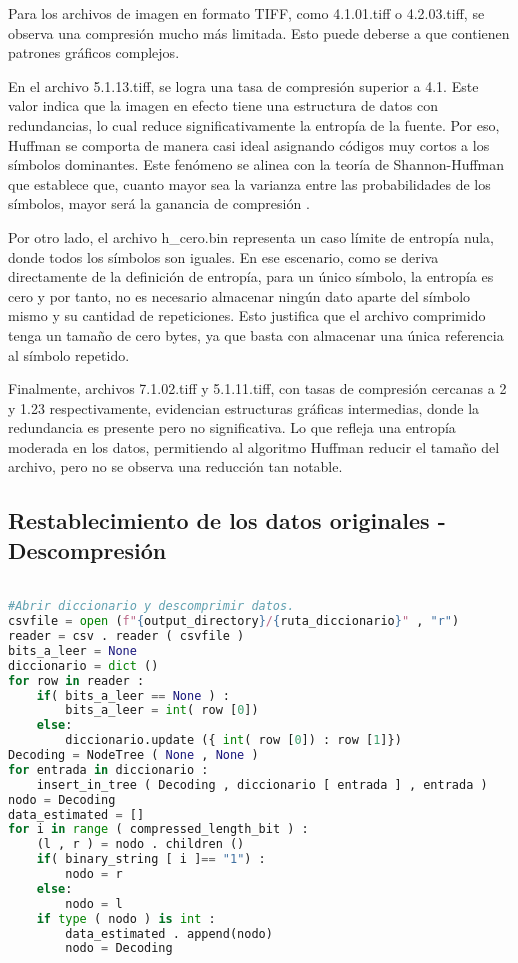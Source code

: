 \documentclass[conference,onecolumn,12pt]{IEEEtran}
\numberwithin{equation}{subsection}
\begin{document}
Para los archivos de imagen en formato TIFF, como 4.1.01.tiff o 4.2.03.tiff, se observa una compresión mucho más limitada. Esto puede deberse a que contienen patrones gráficos complejos.

En el archivo 5.1.13.tiff, se logra una tasa de compresión superior a 4.1. Este valor indica que la imagen en efecto tiene una estructura de datos con redundancias, lo cual reduce significativamente la entropía de la fuente. Por eso, Huffman se comporta de manera casi ideal asignando códigos muy cortos a los símbolos dominantes. Este fenómeno se alinea con la teoría de Shannon-Huffman que establece que, cuanto mayor sea la varianza entre las probabilidades de los símbolos, mayor será la ganancia de compresión \cite{haykin}.

Por otro lado, el archivo h\_cero.bin representa un caso límite de entropía nula, donde todos los símbolos son iguales. En ese escenario, como se deriva directamente de la definición de entropía, para un único símbolo, la entropía es cero y por tanto, no es necesario almacenar ningún dato aparte del símbolo mismo y su cantidad de repeticiones. Esto justifica que el archivo comprimido tenga un tamaño de cero bytes, ya que basta con almacenar una única referencia al símbolo repetido. 

Finalmente, archivos 7.1.02.tiff y 5.1.11.tiff, con tasas de compresión cercanas a 2 y 1.23 respectivamente, evidencian estructuras gráficas intermedias, donde la redundancia es presente pero no significativa. Lo que refleja una entropía moderada en los datos, permitiendo al algoritmo Huffman reducir el tamaño del archivo, pero no se observa una reducción tan notable.









\subsection{Restablecimiento de los datos originales - Descompresión}

\begin{lstlisting}[language=Python, caption={Código modificado para guardar los datos en una carpeta de destino}, label={listing3}]

#Abrir diccionario y descomprimir datos.
csvfile = open (f"{output_directory}/{ruta_diccionario}" , "r")
reader = csv . reader ( csvfile )
bits_a_leer = None 
diccionario = dict () 
for row in reader :
    if( bits_a_leer == None ) :
        bits_a_leer = int( row [0]) 
    else:
        diccionario.update ({ int( row [0]) : row [1]})
Decoding = NodeTree ( None , None ) 
for entrada in diccionario :
    insert_in_tree ( Decoding , diccionario [ entrada ] , entrada )
nodo = Decoding 
data_estimated = []
for i in range ( compressed_length_bit ) :
    (l , r ) = nodo . children () 
    if( binary_string [ i ]== "1") :
        nodo = r
    else:
        nodo = l
    if type ( nodo ) is int :
        data_estimated . append(nodo)
        nodo = Decoding


\end{lstlisting}
\end{document}

